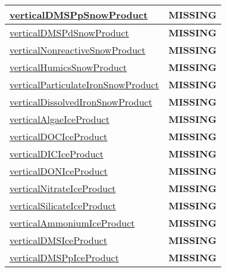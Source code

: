 {\begin{center}
\begin{longtable}{| p{2.0in} | p{4.0in} |}
    \hline
    \hyperref[subsec:var_sec_tracer_products_verticalDMSPpSnowProduct]{verticalDMSPpSnowProduct} & {\bf \color{red} MISSING} \\
    \hline
    \hyperref[subsec:var_sec_tracer_products_verticalDMSPdSnowProduct]{verticalDMSPdSnowProduct} & {\bf \color{red} MISSING} \\
    \hline
    \hyperref[subsec:var_sec_tracer_products_verticalNonreactiveSnowProduct]{verticalNonreactiveSnowProduct} & {\bf \color{red} MISSING} \\
    \hline
    \hyperref[subsec:var_sec_tracer_products_verticalHumicsSnowProduct]{verticalHumicsSnowProduct} & {\bf \color{red} MISSING} \\
    \hline
    \hyperref[subsec:var_sec_tracer_products_verticalParticulateIronSnowProduct]{verticalParticulateIronSnow\-Product} & {\bf \color{red} MISSING} \\
    \hline
    \hyperref[subsec:var_sec_tracer_products_verticalDissolvedIronSnowProduct]{verticalDissolvedIronSnow\-Product} & {\bf \color{red} MISSING} \\
    \hline
    \hyperref[subsec:var_sec_tracer_products_verticalAlgaeIceProduct]{verticalAlgaeIceProduct} & {\bf \color{red} MISSING} \\
    \hline
    \hyperref[subsec:var_sec_tracer_products_verticalDOCIceProduct]{verticalDOCIceProduct} & {\bf \color{red} MISSING} \\
    \hline
    \hyperref[subsec:var_sec_tracer_products_verticalDICIceProduct]{verticalDICIceProduct} & {\bf \color{red} MISSING} \\
    \hline
    \hyperref[subsec:var_sec_tracer_products_verticalDONIceProduct]{verticalDONIceProduct} & {\bf \color{red} MISSING} \\
    \hline
    \hyperref[subsec:var_sec_tracer_products_verticalNitrateIceProduct]{verticalNitrateIceProduct} & {\bf \color{red} MISSING} \\
    \hline
    \hyperref[subsec:var_sec_tracer_products_verticalSilicateIceProduct]{verticalSilicateIceProduct} & {\bf \color{red} MISSING} \\
    \hline
    \hyperref[subsec:var_sec_tracer_products_verticalAmmoniumIceProduct]{verticalAmmoniumIceProduct} & {\bf \color{red} MISSING} \\
    \hline
    \hyperref[subsec:var_sec_tracer_products_verticalDMSIceProduct]{verticalDMSIceProduct} & {\bf \color{red} MISSING} \\
    \hline
    \hyperref[subsec:var_sec_tracer_products_verticalDMSPpIceProduct]{verticalDMSPpIceProduct} & {\bf \color{red} MISSING} \\

\end{longtable}
\end{center}}
